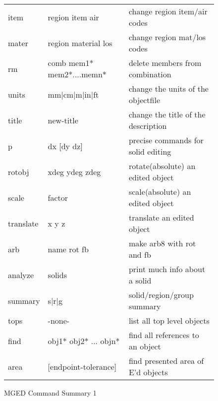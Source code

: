 \begin{figure}[tb]
\begin{tabular}{l l l}
  item	& region item air	& change region item/air codes \\
  mater	& region material los	& change region mat/los codes \\
  rm	& comb mem1* mem2*....memn*	& delete members from combination \\
  units	& mm|cm|m|in|ft	& change the units of the objectfile \\
  title	& new-title	& change the title of the description \\
  p	& dx [dy dz]	& precise commands for solid editing \\
  rotobj	& xdeg ydeg zdeg	& rotate(absolute) an edited object \\
  scale	& factor	& scale(absolute) an edited object \\
  translate	& x y z	& translate an edited object \\
  arb	& name rot fb	& make arb8 with rot and fb \\
  analyze	& solids	& print much info about a solid \\
  summary	& s|r|g	& solid/region/group summary \\
  tops	& -none-	& list all top level objects \\
  find	& obj1* obj2* ... objn*	& find all references to an object \\
  area	& [endpoint-tolerance]	& find presented area of E'd objects \\
\end{tabular}
\caption{MGED Command Summary 1 \label{cmd-summary} }
\end{figure}

